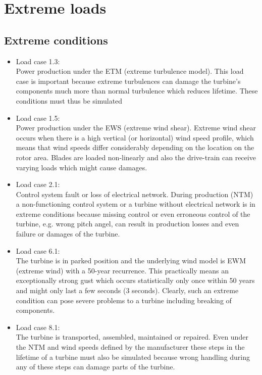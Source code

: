 \documentclass[10pt]{article}
\begin{document}
\section{Extreme loads}
\subsection{Extreme conditions}
\begin{itemize}
\item Load case 1.3: \\
	Power production under the ETM (extreme turbulence model). This load case is important because extreme turbulences can damage the turbine's components much more than normal turbulence which reduces lifetime. These conditions must thus be simulated 
\item Load case 1.5: \\
	Power production under the EWS (extreme wind shear). Extreme wind shear occurs when there is a high vertical (or horizontal) wind speed profile, which means that wind speeds differ considerably depending on the location on the rotor area. Blades are loaded non-linearly and also the drive-train can receive varying loads which might cause damages.
\item Load case 2.1: \\
	Control system fault or loss of electrical network. During production (NTM) a non-functioning control system or a turbine without electrical network is in extreme conditions because missing control or even erroneous control of the turbine, e.g. wrong pitch angel, can result in production losses and even failure or damages of the turbine.
\item Load case 6.1: \\
	The turbine is in parked position and the underlying wind model is EWM (extreme wind) with a 50-year recurrence. This practically means an exceptionally strong gust which occurs statistically only once within 50 years and might only last a few seconds (3 seconds). Clearly, such an extreme condition can pose severe problems to a turbine including breaking of components.
\item Load case 8.1: \\
	The turbine is transported, assembled, maintained or repaired. Even under the NTM and wind speeds defined by the manufacturer these steps in the lifetime of a turbine must also be simulated because wrong handling during any of these steps can damage parts of the turbine.
\end{itemize}
\end{document}
